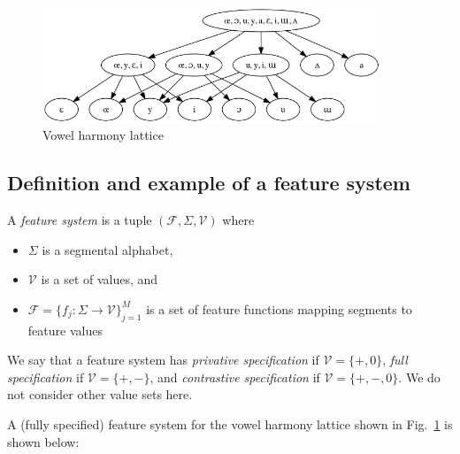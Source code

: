 \documentclass[11pt, oneside]{article}   	%
\begin{document}
\begin{figure}[h]
\includegraphics[width=0.9\textwidth]{vowelHarmony_unicode.png}
\caption{Vowel harmony lattice}
\label{fig:lattice}
\end{figure}

\subsection{Definition and example of a feature system}

A \textit{feature system} is a tuple $(\mathcal F, \Sigma, \mathcal V)$ where \begin{itemize}
    \item $\Sigma$ is a segmental alphabet, 
    \item $\mathcal V$ is a set of values, and 
    \item $\mathcal F = \{f_j : \Sigma \rightarrow \mathcal V\}_{j=1}^M$ is a set of feature functions mapping segments to feature values
    \end{itemize}

We say that a feature system has \textit{privative specification} if $\mathcal V = \{ +, 0 \}$, \textit{full specification} if $\mathcal V = \{ +, - \}$, and \textit{contrastive specification} if $\mathcal V = \{ +, -, 0 \}$. We do not consider other value sets here.
        
A (fully specified) feature system for the vowel harmony lattice shown in Fig.~\ref{fig:lattice} is shown below:
\end{document}
